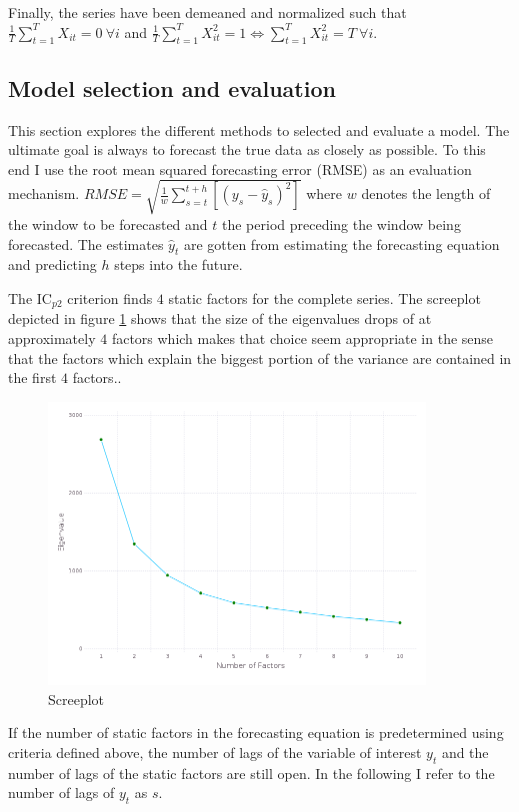 \documentclass[12pt]{article}
\begin{document}
Finally, the series have been demeaned and normalized such that $\frac{1}{T}\sum_{t=1}^T X_{it} = 0 \ \forall i$ and $\frac{1}{T}\sum_{t=1}^T X_{it}^2 = 1 \Leftrightarrow \sum_{t=1}^T X_{it}^2 = T \ \forall i$. \\


\subsection{Model selection and evaluation}
This section explores the different methods to selected and evaluate a model. The ultimate goal is always to forecast the true data as closely as possible. To this end I use the root mean squared forecasting error (RMSE) as an evaluation mechanism. $RMSE = \sqrt{\frac{1}{w}\sum_{s=t}^{t+h}[(y_s - \hat y_s)^2]}$ where $w$ denotes the length of the window to be forecasted and $t$ the period preceding the window being forecasted. The estimates $\hat y_t$ are gotten from estimating the forecasting equation and predicting $h$ steps into the future.

The IC$_{p2}$ criterion finds $4$ static factors for the complete series. The screeplot depicted in figure \ref{screeplot} shows that the size of the eigenvalues drops of at approximately $4$ factors which makes that choice seem appropriate in the sense that the factors which explain the biggest portion of the variance are contained in the first $4$ factors..

\begin{figure}[htp]
\centering
\includegraphics[width=10cm]{graphs/screeplot.png}
\caption{Screeplot}
\label{screeplot}
\end{figure}

If the number of static factors in the forecasting equation is predetermined using criteria defined above, the number of lags of the variable of interest $y_t$ and the number of lags of the static factors are still open. In the following I refer to the number of lags of $y_t$ as $s$. 
\end{document}
